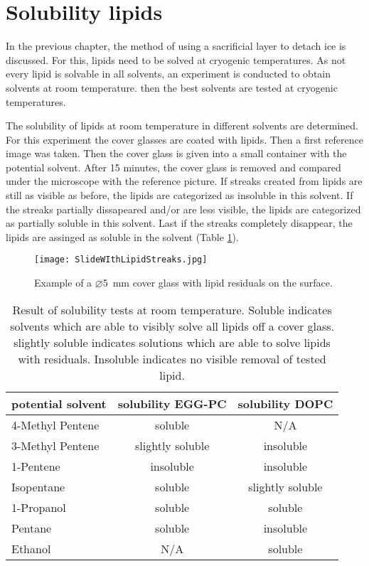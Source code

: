 
\section{Solubility lipids}

In the previous chapter, the method of using a sacrificial layer to detach ice is discussed. For this, lipids need to be solved at cryogenic temperatures. As not every lipid is solvable in all solvents, an experiment is conducted to obtain solvents at room temperature. then the best solvents are tested at cryogenic temperatures.

The solubility of lipids at room temperature in different solvents are determined. For this experiment the cover glasses are coated with lipids. Then a first reference image was taken. Then the cover glass is given into a small container with the potential solvent. After 15 minutes, the cover glass is removed and compared under the microscope with the reference picture. If streaks created from lipids are still as visible as before, the lipids are categorized as insoluble in this solvent. If the streaks partially dissapeared and/or are less visible, the lipids are categorized as partially soluble in this solvent. Last if the streaks completely disappear, the lipids are assinged as soluble in the solvent (Table \ref{table:LoeslichkeitRaumtemperatur}).

\begin{figure}[hbt!]
	\centering
	\texttt{[image: SlideWIthLipidStreaks.jpg]}
	\caption{Example of a $\varnothing$\SI{5}{\milli\meter} cover glass with lipid residuals on the surface.}
\end{figure}


\begin{table}[hbt!]
	\centering
	\begin{tabular}{|l|c|c|}
		\hline
		potential solvent & solubility EGG-PC & solubility DOPC \\
		\hline
		\hline
		4-Methyl Pentene & soluble & N/A  \\ 
		\hline
		3-Methyl Pentene & slightly soluble & insoluble \\
		\hline
		1-Pentene & insoluble & insoluble \\
		\hline
		Isopentane & soluble & slightly soluble\\
		\hline
		1-Propanol & soluble & soluble\\
		\hline
		Pentane & soluble & insoluble\\
		\hline
		Ethanol & N/A & soluble\\
		\hline
	\end{tabular}
	\caption{Result of solubility tests at room temperature. Soluble indicates solvents which are able to visibly solve all lipids off a cover glass. slightly soluble indicates solutions which are able to solve lipids with residuals. Insoluble indicates no visible removal of tested lipid.}
	\label{table:LoeslichkeitRaumtemperatur}
\end{table}

